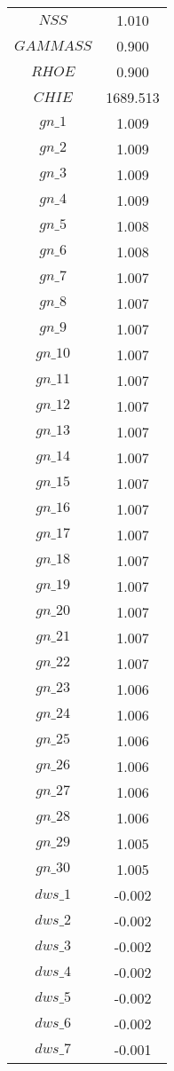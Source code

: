 \begin{center}
\begin{longtable}{cc}
$NSS$ 	 & 	 1.010 \\
$GAMMASS$ 	 & 	 0.900 \\
$RHOE$ 	 & 	 0.900 \\
$CHIE$ 	 & 	 1689.513 \\
$gn\_1$ 	 & 	 1.009 \\
$gn\_2$ 	 & 	 1.009 \\
$gn\_3$ 	 & 	 1.009 \\
$gn\_4$ 	 & 	 1.009 \\
$gn\_5$ 	 & 	 1.008 \\
$gn\_6$ 	 & 	 1.008 \\
$gn\_7$ 	 & 	 1.007 \\
$gn\_8$ 	 & 	 1.007 \\
$gn\_9$ 	 & 	 1.007 \\
$gn\_10$ 	 & 	 1.007 \\
$gn\_11$ 	 & 	 1.007 \\
$gn\_12$ 	 & 	 1.007 \\
$gn\_13$ 	 & 	 1.007 \\
$gn\_14$ 	 & 	 1.007 \\
$gn\_15$ 	 & 	 1.007 \\
$gn\_16$ 	 & 	 1.007 \\
$gn\_17$ 	 & 	 1.007 \\
$gn\_18$ 	 & 	 1.007 \\
$gn\_19$ 	 & 	 1.007 \\
$gn\_20$ 	 & 	 1.007 \\
$gn\_21$ 	 & 	 1.007 \\
$gn\_22$ 	 & 	 1.007 \\
$gn\_23$ 	 & 	 1.006 \\
$gn\_24$ 	 & 	 1.006 \\
$gn\_25$ 	 & 	 1.006 \\
$gn\_26$ 	 & 	 1.006 \\
$gn\_27$ 	 & 	 1.006 \\
$gn\_28$ 	 & 	 1.006 \\
$gn\_29$ 	 & 	 1.005 \\
$gn\_30$ 	 & 	 1.005 \\
$dws\_1$ 	 & 	 -0.002 \\
$dws\_2$ 	 & 	 -0.002 \\
$dws\_3$ 	 & 	 -0.002 \\
$dws\_4$ 	 & 	 -0.002 \\
$dws\_5$ 	 & 	 -0.002 \\
$dws\_6$ 	 & 	 -0.002 \\
$dws\_7$ 	 & 	 -0.001 \\

\end{longtable}
\end{center}
